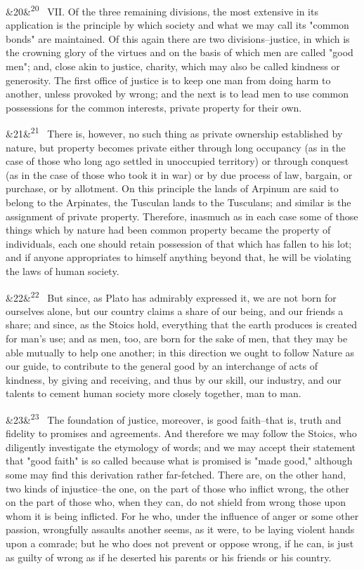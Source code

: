 \documentclass[12pt]{article}
\newcommand{\para}[1][]{\par\noindent\ifx&#1&\else\textsuperscript{\footnotesize #1}~\fi}
\begin{document}
\para[20] VII. Of the three remaining divisions, the most extensive in its application is the principle by which society and what we may call its "common bonds" are maintained. Of this again there are two divisions--justice, in which is the crowning glory of the virtues and on the basis of which men are called "good men"; and, close akin to justice, charity, which may also be called kindness or generosity. The first office of justice is to keep one man from doing harm to another, unless provoked by wrong; and the next is to lead men to use common possessions for the common interests, private property for their own.

\para[21] There is, however, no such thing as private ownership established by nature, but property becomes private either through long occupancy (as in the case of those who long ago settled in unoccupied territory) or through conquest (as in the case of those who took it in war) or by due process of law, bargain, or purchase, or by allotment. On this principle the lands of Arpinum are said to belong to the Arpinates, the Tusculan lands to the Tusculans; and similar is the assignment of private property. Therefore, inasmuch as in each case some of those things which by nature had been common property became the property of individuals, each one should retain possession of that which has fallen to his lot; and if anyone appropriates to himself anything beyond that, he will be violating the laws of human society.

\para[22] But since, as Plato has admirably expressed it, we are not born for ourselves alone, but our country claims a share of our being, and our friends a share; and since, as the Stoics hold, everything that the earth produces is created for man's use; and as men, too, are born for the sake of men, that they may be able mutually to help one another; in this direction we ought to follow Nature as our guide, to contribute to the general good by an interchange of acts of kindness, by giving and receiving, and thus by our skill, our industry, and our talents to cement human society more closely together, man to man.

\para[23] The foundation of justice, moreover, is good faith--that is, truth and fidelity to promises and agreements. And therefore we may follow the Stoics, who diligently investigate the etymology of words; and we may accept their statement that "good faith" is so called because what is promised is "made good," although some may find this derivation rather far-fetched. There are, on the other hand, two kinds of injustice--the one, on the part of those who inflict wrong, the other on the part of those who, when they can, do not shield from wrong those upon whom it is being inflicted. For he who, under the influence of anger or some other passion, wrongfully assaults another seems, as it were, to be laying violent hands upon a comrade; but he who does not prevent or oppose wrong, if he can, is just as guilty of wrong as if he deserted his parents or his friends or his country.
\end{document}
